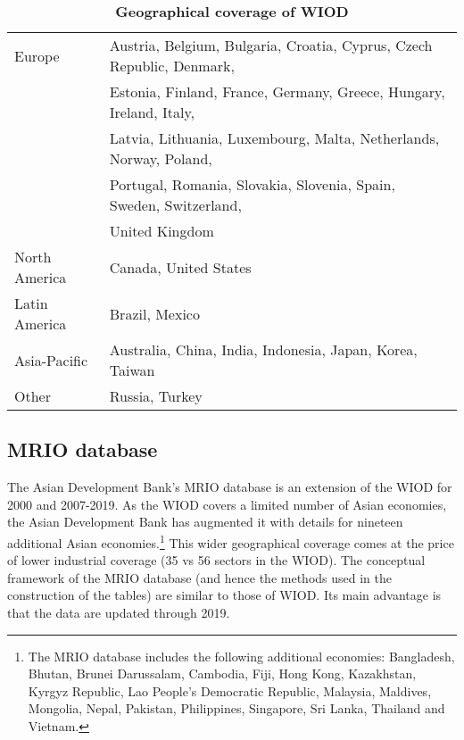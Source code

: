 \documentclass[11pt,a4paper]{paper} %
\begin{document}
 
\begin{table}[!h]
\begin{threeparttable}
\centering
\centering
\caption{\small{\textbf{Geographical coverage of WIOD}}}
\small
\begin{tabular}{ll}
\hline\hline
Europe & Austria, Belgium, Bulgaria, Croatia, Cyprus, Czech Republic, Denmark,\\
& Estonia, Finland, France, Germany, Greece, Hungary, Ireland, Italy,\\
& Latvia, Lithuania, Luxembourg, Malta, Netherlands, Norway, Poland,\\
&Portugal, Romania, Slovakia, Slovenia, Spain, Sweden, Switzerland,\\
& United Kingdom\\
North  America& Canada, United States\\
Latin America & Brazil, Mexico \\
Asia-Pacific & Australia, China, India, Indonesia, Japan, Korea, Taiwan\\
Other & Russia, Turkey\\
\hline\hline
\end{tabular} 
\label{tab:wiod}
\end{threeparttable}
\end{table} 

\subsection{MRIO database} 
The Asian Development Bank's MRIO database is an extension of the WIOD for 2000 and 2007-2019.
As the WIOD covers a limited number of Asian economies, the Asian Development Bank has augmented it with details for nineteen additional Asian economies.\footnote{The MRIO database includes the following additional economies: Bangladesh, Bhutan, Brunei Darussalam, Cambodia, Fiji, Hong Kong, Kazakhstan, Kyrgyz Republic, Lao People’s Democratic Republic, Malaysia, Maldives, Mongolia, Nepal, Pakistan, Philippines, Singapore, Sri Lanka, Thailand and Vietnam.}
This wider geographical coverage comes at the price of lower industrial coverage (35 vs 56 sectors in the WIOD).
The conceptual framework of the MRIO database (and hence the methods used in the construction of the tables) are similar to those of WIOD.
Its main advantage is that the data are updated through 2019.  
\end{document}
